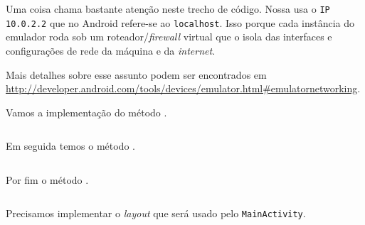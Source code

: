 \begin{listing}[H]
  \inputminted[linenos=true,frame=bottomline,tabsize=3]{ java }{ source/Requisicao-1.java }
  \caption{Classe para realizar requisições HTTP [Requisicao.java]}
\end{listing}

Uma coisa chama bastante atenção neste trecho de código. Nossa  usa o \texttt{IP
10.0.2.2} que no Android refere-se ao \texttt{localhost}. Isso porque cada instância do emulador
roda sob um roteador/\textit{firewall} virtual que o isola das interfaces e configurações de rede
da máquina e da \textit{internet}.

Mais detalhes sobre esse assunto podem ser encontrados em
\url{http://developer.android.com/tools/devices/emulator.html#emulatornetworking}.

Vamos a implementação do método .

\begin{listing}[H]
  \inputminted[linenos=true,frame=bottomline,tabsize=3]{ java }{ source/Requisicao-2.java }
  \caption{Implementação do método enviar [Requisicao.java]}
\end{listing}

Em seguida temos o método .

\begin{listing}[H]
  \inputminted[linenos=true,frame=bottomline,tabsize=3]{ java }{ source/Requisicao-3.java }
  \caption{Implementação do método lerResposta [Requisicao.java]}
\end{listing}

\newpage

Por fim o método .

\begin{listing}[H]
  \inputminted[linenos=true,frame=bottomline,tabsize=3]{ java }{ source/Requisicao-4.java }
  \caption{Implementação do método parseJSON [Requisicao.java]}
\end{listing}

Precisamos implementar o \textit{layout} que será usado pelo \texttt{MainActivity}.

\begin{listing}[H]
  \inputminted[linenos=true,frame=bottomline,tabsize=3]{ xml }{ source/activity_main-1.xml }
  \caption{layout para envio e recebimento de mensagens [activity\b{ }main.xml]}
\end{listing}


